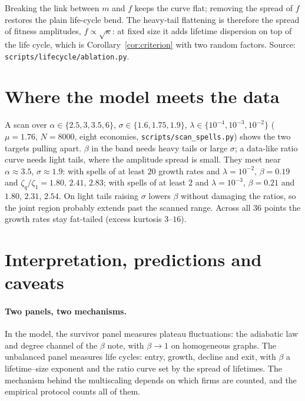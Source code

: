 \documentclass[11pt]{article}
\theoremstyle{remark}
\begin{document}
Breaking the link between $m$ and $f$ keeps the curve flat; removing the spread of $f$ restores the plain
life-cycle bend.  The heavy-tail flattening is therefore the spread of fitness amplitudes, $f\propto\sqrt\kappa$:
at fixed size it adds lifetime dispersion on top of the life cycle, which is Corollary~\ref{cor:criterion} with
two random factors.  Source: \texttt{scripts/lifecycle/ablation.py}.

\section{Where the model meets the data}

A scan over $\alpha\in\{2.5,3,3.5,6\}$, $\sigma\in\{1.6,1.75,1.9\}$, $\lambda\in\{10^{-4},10^{-3},10^{-2}\}$
($\mu=1.76$, $N=8000$, eight economies, \texttt{scripts/scan\_spells.py}) shows the two targets pulling apart.
$\beta$ in the band needs heavy tails or large $\sigma$; a data-like ratio curve needs light tails, where the
amplitude spread is small.  They meet near $\alpha\approx3.5$, $\sigma\approx1.9$: with spells of at least $20$
growth rates and $\lambda=10^{-2}$, $\beta=0.19$ and $\zeta_q/\zeta_1=1.80,\,2.41,\,2.83$; with spells of at least
$2$ and $\lambda=10^{-3}$, $\beta=0.21$ and $1.80,\,2.31,\,2.54$.  On light tails raising $\sigma$ lowers $\beta$
without damaging the ratios, so the joint region probably extends past the scanned range.  Across all $36$
points the growth rates stay fat-tailed (excess kurtosis $3$--$16$).

\section{Interpretation, predictions and caveats}

\paragraph{Two panels, two mechanisms.}  In the model, the survivor panel measures plateau fluctuations: the
adiabatic law and degree channel of the $\beta$ note, with $\beta\to1$ on homogeneous graphs.  The unbalanced
panel measures life cycles: entry, growth, decline and exit, with $\beta$ a lifetime--size exponent and the
ratio curve set by the spread of lifetimes.  The mechanism behind the multiscaling depends on which firms are
counted, and the empirical protocol counts all of them.
\end{document}
